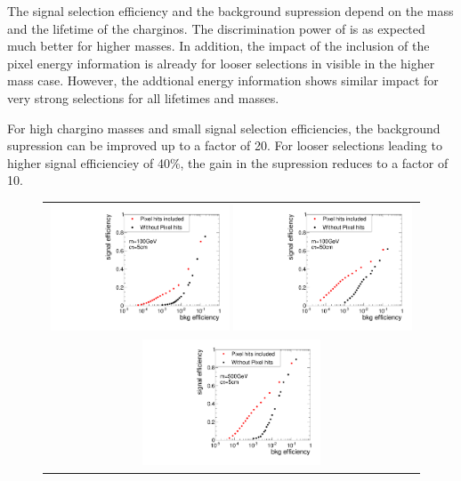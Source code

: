 The signal selection efficiency and the background supression depend on the mass and the lifetime of the charginos.
The discrimination power of \ias is as expected much better for higher masses.
In addition, the impact of the inclusion of the pixel energy information is already for looser selections in \ias visible in the higher mass case.
However, the addtional energy information shows similar impact for very strong selections for all lifetimes and masses.

For high chargino masses and small signal selection efficiencies, the background supression can be improved up to a factor of 20.
For looser selections leading to higher signal efficienciey of 40\%, the gain in the supression reduces to a factor of 10.

\begin{figure}[!bt]
  \centering 
  \begin{tabular}{c}
    \includegraphics[width=0.49\textwidth]{figures/analysis/rocplot_wjets_mass_100GeV_ctau_5cm.pdf} 
    \includegraphics[width=0.49\textwidth]{figures/analysis/rocplot_wjets_mass_100GeV_ctau_50cm.pdf} \\
    \includegraphics[width=0.49\textwidth]{figures/analysis/rocplot_wjets_mass_500GeV_ctau_5cm.pdf} 

\end{tabular}
\end{figure}
